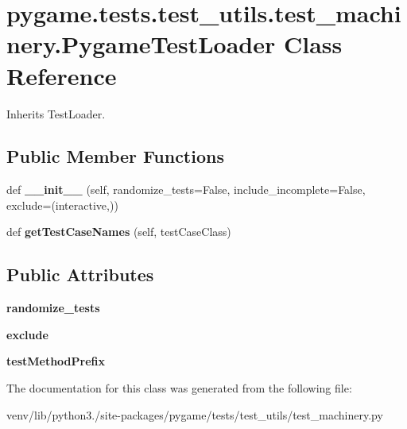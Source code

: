 \hypertarget{classpygame_1_1tests_1_1test__utils_1_1test__machinery_1_1_pygame_test_loader}{}\section{pygame.\+tests.\+test\+\_\+utils.\+test\+\_\+machinery.\+Pygame\+Test\+Loader Class Reference}
\label{classpygame_1_1tests_1_1test__utils_1_1test__machinery_1_1_pygame_test_loader}


Inherits Test\+Loader.

\subsection*{Public Member Functions}
\begin{DoxyCompactItemize}
\item 
\mbox{\label{classpygame_1_1tests_1_1test__utils_1_1test__machinery_1_1_pygame_test_loader_a9b9a102138e6b1a97f4b969143396eb4}} 
def {\bfseries \+\_\+\+\_\+init\+\_\+\+\_\+} (self, randomize\+\_\+tests=False, include\+\_\+incomplete=False, exclude=(\textquotesingle{}interactive\textquotesingle{},))
\item 
\mbox{\label{classpygame_1_1tests_1_1test__utils_1_1test__machinery_1_1_pygame_test_loader_a76a71cd1d3b46331876b1e16f0908eb7}} 
def {\bfseries get\+Test\+Case\+Names} (self, test\+Case\+Class)
\end{DoxyCompactItemize}
\subsection*{Public Attributes}
\begin{DoxyCompactItemize}
\item 
\mbox{\label{classpygame_1_1tests_1_1test__utils_1_1test__machinery_1_1_pygame_test_loader_ab8bfad80a2644e400be162968a81e6b0}} 
{\bfseries randomize\+\_\+tests}
\item 
\mbox{\label{classpygame_1_1tests_1_1test__utils_1_1test__machinery_1_1_pygame_test_loader_aabcea74116200a30aa609ee8dc9662dd}} 
{\bfseries exclude}
\item 
\mbox{\label{classpygame_1_1tests_1_1test__utils_1_1test__machinery_1_1_pygame_test_loader_a73c9a88c3f75ea1e73e536a09e20d413}} 
{\bfseries test\+Method\+Prefix}
\end{DoxyCompactItemize}


The documentation for this class was generated from the following file\+:\begin{DoxyCompactItemize}
\item 
venv/lib/python3./site-\/packages/pygame/tests/test\+\_\+utils/test\+\_\+machinery.\+py\end{DoxyCompactItemize}
